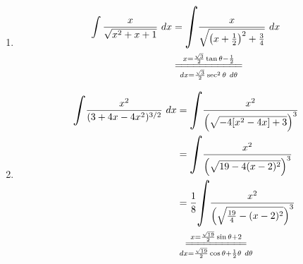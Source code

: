 \documentclass{article}
\def\scaleint#1{\vcenter{\hbox{\scaleto[3ex]{\displaystyle\int}{#1}}}}
\begin{document}
\begin{enumerate}[label={\bf{}\arabic*}.]
\item%
	\begin{align*}
	\int\frac{x}{\sqrt{x^2+x+1}}\ dx&=\scaleint{10ex}\frac{x}{\sqrt{\left(x+\frac{1}{2}\right)^2+\frac{3}{4}}}\ dx\\
	&\overset{x=\frac{\sqrt{3}}{2}\tan\theta-\frac{1}{2}}{\underset{dx=\frac{\sqrt{3}}{2}\sec^2\theta\ d\theta}{=\joinrel=\joinrel=\joinrel=\joinrel=\joinrel=\joinrel=\joinrel=\joinrel=\joinrel=\joinrel=}}
	\end{align*}

\item%
	\begin{align*}
	\scaleint{7ex}\frac{x^2}{(3+4x-4x^2)^{3/2}}\ dx&=\scaleint{9ex}\frac{x^2}{\left(\sqrt{-4[x^2-4x]+3}\right)^3}\\
	&=\scaleint{9ex}\frac{x^2}{\left(\sqrt{19-4(x-2)^2}\right)^3}\\
	&=\frac{1}{8}\scaleint{11ex}\frac{x^2}{\left(\sqrt{\frac{19}{4}-(x-2)^2}\right)^3}\\
	&\overset{x=\frac{\sqrt{19}}{2}\sin\theta+2}{\underset{dx=\frac{\sqrt{19}}{2}\cos\theta+\frac{1}{2}\theta\ d\theta}{=\joinrel=\joinrel=\joinrel=\joinrel=\joinrel=\joinrel=\joinrel=\joinrel=\joinrel=}}
	\end{align*}
\end{enumerate}
\end{document}
